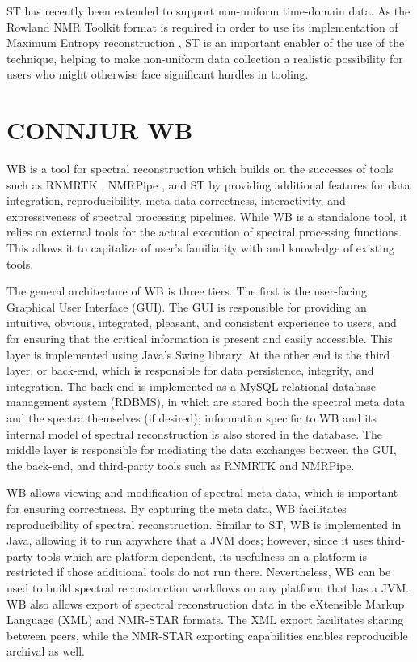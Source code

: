 ST has recently been extended to support non-uniform time-domain
data.  As the Rowland NMR Toolkit format is required in order to use its 
implementation of Maximum Entropy reconstruction \cite{rnmrtk}, ST
is an important enabler of the use of the technique, helping to 
make non-uniform data collection a realistic possibility for users who might
otherwise face significant hurdles in tooling.


\section{CONNJUR WB}
WB is a tool for spectral reconstruction which
builds on the successes of tools such as RNMRTK \cite{rnmrtk}, NMRPipe \cite{nmrpipe},
and ST \cite{connjur-st} by providing additional features
for data integration, reproducibility, meta data correctness, interactivity,
and expressiveness of spectral processing pipelines.  While WB
is a standalone tool, it relies on external tools for the actual execution of
spectral processing functions.  This allows it to capitalize of user's 
familiarity with and knowledge of existing tools.

The general architecture of WB is three tiers.  The first is 
the user-facing Graphical User Interface (GUI).  The GUI is responsible for
providing an intuitive, obvious, integrated, pleasant, and consistent experience
to users, and for ensuring that the critical information is present and easily
accessible.  This layer is implemented using Java's Swing library.
At the other end is the third layer, or back-end, which is
responsible for data persistence, integrity, and integration.  The back-end
is implemented as a MySQL relational database management system (RDBMS), in
which are stored both the spectral meta data and the spectra themselves (if
desired); information specific to WB and its internal model
of spectral reconstruction is also stored in the database.  The middle layer
is responsible for mediating the data exchanges between the GUI, the back-end,
and third-party tools such as RNMRTK and NMRPipe.

WB allows viewing and modification of spectral meta data, which 
is important for ensuring correctness.  By capturing the meta data, WB
facilitates reproducibility of spectral reconstruction.  Similar to
ST, WB is implemented in Java, allowing it to
run anywhere that a JVM does; however, since it uses third-party tools which 
are platform-dependent, its usefulness on a platform is restricted if those
additional tools do not run there.  Nevertheless, WB can be used to build
spectral reconstruction workflows on any platform that has a JVM.
WB also allows export of spectral reconstruction data in the eXtensible Markup 
Language (XML) and NMR-STAR formats.  The XML export
facilitates sharing between peers, while the NMR-STAR exporting capabilities
enables reproducible archival as well.

